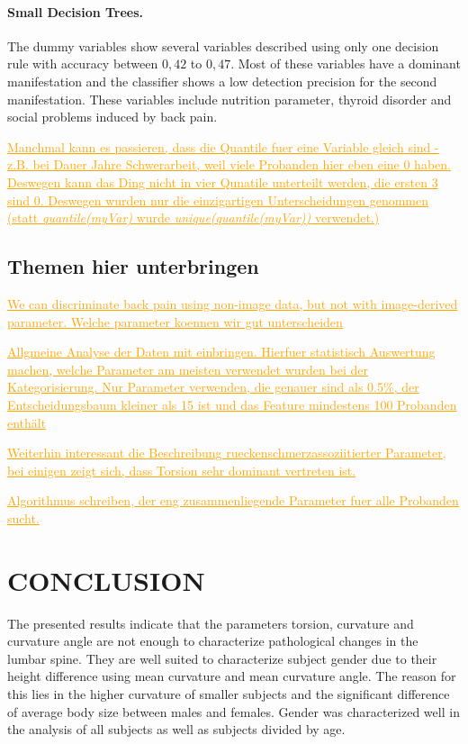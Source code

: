 \documentclass[a4paper,twoside]{style/article}
\newcommand{\com}[1]{\textcolor{orange}{\uline{#1}}}
\begin{document}
\paragraph{Small Decision Trees. }
The dummy variables show several variables described using only one decision rule with accuracy between $0,42$ to $0,47$.
Most of these variables have a dominant manifestation and the classifier shows a low detection precision for the second manifestation.
These variables include nutrition parameter, thyroid disorder and social problems induced by back pain.


\com{Manchmal kann es passieren, dass die Quantile fuer eine Variable gleich sind - z.B. bei Dauer Jahre Schwerarbeit, weil viele Probanden hier eben eine 0 haben. Deswegen kann das Ding nicht in vier Qunatile unterteilt werden, die ersten 3 sind 0. Deswegen wurden nur die einzigartigen Unterscheidungen genommen (statt \emph{quantile(myVar)} wurde \emph{unique(quantile(myVar))} verwendet.)}

\subsection{Themen hier unterbringen}

\com{We can discriminate back pain using non-image data, but not with image-derived parameter. Welche parameter koennen wir gut unterscheiden}

\com{Allgmeine Analyse der Daten mit einbringen. Hierfuer statistisch Auswertung machen, welche Parameter am meisten verwendet wurden bei der Kategorisierung. Nur Parameter verwenden, die genauer sind als 0.5\%, der Entscheidungsbaum kleiner als 15 ist und das Feature mindestens 100 Probanden enthält}

\com{Weiterhin interessant die Beschreibung rueckenschmerzassoziitierter Parameter, bei einigen zeigt sich, dass Torsion sehr dominant vertreten ist.}

\com{Algorithmus schreiben, der eng zusammenliegende Parameter fuer alle Probanden sucht.}

\section{\uppercase{Conclusion}}
\label{sec:Conclusion}
\noindent The presented results indicate that the parameters torsion, curvature and curvature angle are not enough to characterize pathological changes in the lumbar spine.
They are well suited to characterize subject gender due to their height difference using mean curvature and mean curvature angle.
The reason for this lies in the higher curvature of smaller subjects and the significant difference of average body size between males and females.
Gender was characterized well in the analysis of all subjects as well as subjects divided by age.
\end{document}
